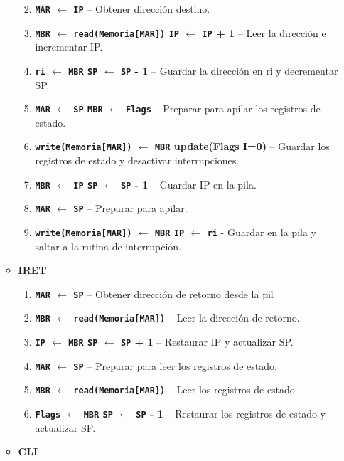 \documentclass[12pt,oneside]{templates/unerthesis}
\providecommand{\tightlist}{%
  \setlength{\itemsep}{0pt}\setlength{\parskip}{0pt}}
\begin{document}
\begin{itemize}
\begin{itemize}
    \begin{enumerate}
    \def\labelenumi{\arabic{enumi}.}
    \setcounter{enumi}{3}
    \tightlist
    \item
      \textbf{\texttt{MAR} \(\leftarrow\) \texttt{IP}} -- Obtener dirección destino.
    \item
      \textbf{\texttt{MBR} \(\leftarrow\) \texttt{read(Memoria{[}MAR{]})} \textbar{} \texttt{IP} \(\leftarrow\) \texttt{IP} + 1} -- Leer la dirección e incrementar IP.
    \item
      \textbf{\texttt{ri} \(\leftarrow\) \texttt{MBR} \textbar{} \texttt{SP} \(\leftarrow\) \texttt{SP} - 1} -- Guardar la dirección en ri y decrementar SP.
    \item
      \textbf{\texttt{MAR} \(\leftarrow\) \texttt{SP} \textbar{} \texttt{MBR} \(\leftarrow\) \texttt{Flags}} -- Preparar para apilar los registros de estado.
    \item
      \textbf{\texttt{write(Memoria{[}MAR{]})} \(\leftarrow\) \texttt{MBR} \textbar{} update(Flags I=0)} -- Guardar los registros de estado y desactivar interrupciones.
    \item
      \textbf{\texttt{MBR} \(\leftarrow\) \texttt{IP} \textbar{} \texttt{SP} \(\leftarrow\) \texttt{SP} - 1} -- Guardar IP en la pila.
    \item
      \textbf{\texttt{MAR} \(\leftarrow\) \texttt{SP}} -- Preparar para apilar.
    \item
      \textbf{\texttt{write(Memoria{[}MAR{]})} \(\leftarrow\) \texttt{MBR} \textbar{} \texttt{IP} \(\leftarrow\) \texttt{ri}} - Guardar en la pila y saltar a la rutina de interrupción.
    \end{enumerate}
  \item
    \textbf{IRET}

    \begin{enumerate}
    \def\labelenumi{\arabic{enumi}.}
    \setcounter{enumi}{3}
    \tightlist
    \item
      \textbf{\texttt{MAR} \(\leftarrow\) \texttt{SP}} -- Obtener dirección de retorno desde la pil
    \item
      \textbf{\texttt{MBR} \(\leftarrow\) \texttt{read(Memoria{[}MAR{]})}} -- Leer la dirección de retorno.
    \item
      \textbf{\texttt{IP} \(\leftarrow\) \texttt{MBR} \textbar{} \texttt{SP} \(\leftarrow\) \texttt{SP} + 1} -- Restaurar IP y actualizar SP.
    \item
      \textbf{\texttt{MAR} \(\leftarrow\) \texttt{SP}} -- Preparar para leer los registros de estado.
    \item
      \textbf{\texttt{MBR} \(\leftarrow\) \texttt{read(Memoria{[}MAR{]})}} -- Leer los registros de estado
    \item
      \textbf{\texttt{Flags} \(\leftarrow\) \texttt{MBR} \textbar{} \texttt{SP} \(\leftarrow\) \texttt{SP} - 1} -- Restaurar los registros de estado y actualizar SP.
    \end{enumerate}
  \item
    \textbf{CLI}


\end{itemize}
\end{itemize}
\end{document}
